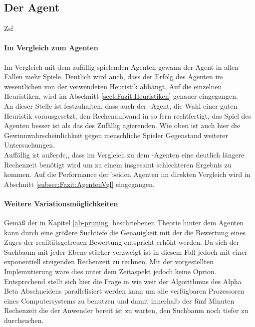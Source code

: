 \subsection{Der Agent }
Zsf 
\paragraph{Im Vergleich zum Agenten }
Im Vergleich mit dem zufällig spielenden Agenten gewann der Agent  in allen  Fällen mehr Spiele. Deutlich wird auch, dass der Erfolg des Agenten im wesentlichen von der verwendeten Heuristik abhängt. Auf die einzelnen Heuristiken, wird im Abschnitt \ref{sect:Fazit:Heuristiken} genauer eingegangen.
\\An dieser Stelle ist festzuhalten, dass auch der -Agent, die Wahl einer guten Heuristik vorausgesetzt, den Rechenaufwand in so fern rechtfertigt, das Spiel des Agenten besser ist als das des Zufällig agierenden. Wie oben ist auch hier die Gewinnwahrscheinlichkeit gegen menschliche Spieler Gegenstand weiterer Untersuchungen.
\\Auffällig ist außerde,, dass im Vergleich zu dem -Agenten eine deutlich längere Rechenzeit benötigt wird um zu einem insgesamt schlechteren Ergebnis zu kommen. Auf die Performance der beiden Agenten im direkten Vergleich wird in Abschnitt \ref{subsec:Fazit:AgentenVgl} eingegangen.
\paragraph{Weitere Variationsmöglichkeiten}
Gemäß der in Kapitel \ref{ab-pruning} beschriebenen Theorie hinter dem Agenten  kann durch eine größere Suchtiefe  die Genauigkeit mit der die Bewertung eines Zuges der realitätsgetreuen Bewertung entspricht erhöht werden. Da sich der Suchbaum mit jeder Ebene stärker verzweigt ist in diesem Fall jedoch mit einer exponentiell steigenden Rechenzeit zu rechnen. Mit der vorgestellten Implemntierung wäre dies unter dem Zeitaspekt jedoch keine Oprion. Entsprechend stellt sich hier die Frage in wie weit der Algorithmus des Alpha Beta Abschneidens parallelisiert werden kann um alle verfügbaren Prozessoren eines Computersystems zu benutzen und damit innerhalb der fünf Minuten Rechenzeit die der Anwender bereit ist zu warten, den Suchbaum noch tiefer zu durchsuchen.


